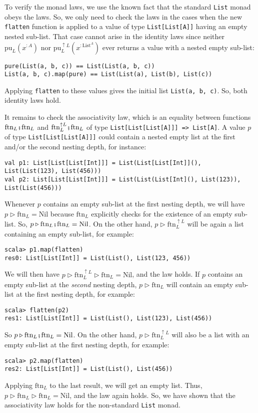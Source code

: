To verify the monad laws, we use the known fact that the standard
\lstinline!List! monad obeys the laws. So, we only need to check
the laws in the cases when the new \lstinline!flatten! function is
applied to a value of type \lstinline!List[List[A]]! having an empty
nested sub-list. That case cannot arise in the identity laws since
neither $\text{pu}_{L}(x^{:A})$ nor $\text{pu}_{L}^{\uparrow L}(x^{:\text{List}^{A}})$
ever returns a value with a nested empty sub-list:
\begin{lstlisting}
pure(List(a, b, c)) == List(List(a, b, c))
List(a, b, c).map(pure) == List(List(a), List(b), List(c))
\end{lstlisting}
Applying \lstinline!flatten! to these values gives the initial list
\lstinline!List(a, b, c)!. So, both identity laws hold.

It remains to check the associativity law, which is an equality between
functions $\text{ftn}_{L}\bef\text{ftn}_{L}$ and $\text{ftn}_{L}^{\uparrow L}\bef\text{ftn}_{L}$
of type \lstinline!List[List[List[A]]] => List[A]!. A value $p$
of type \lstinline!List[List[List[A]]]! could contain a nested empty
list at the first and/or the second nesting depth, for instance:
\begin{lstlisting}
val p1: List[List[List[Int]]] = List(List[List[Int]](), List(List(123), List(456)))
val p2: List[List[List[Int]]] = List(List(List[Int](), List(123)), List(List(456)))
\end{lstlisting}
Whenever $p$ contains an empty sub-list at the first nesting depth,
we will have $p\triangleright\text{ftn}_{L}=\text{Nil}$ because $\text{ftn}_{L}$
explicitly checks for the existence of an empty sub-list. So, $p\triangleright\text{ftn}_{L}\bef\text{ftn}_{L}=\text{Nil}$.
On the other hand, $p\triangleright\text{ftn}_{L}^{\uparrow L}$ will
be again a list containing an empty sub-list, for example:
\begin{lstlisting}
scala> p1.map(flatten)
res0: List[List[Int]] = List(List(), List(123, 456))
\end{lstlisting}
We will then have $p\triangleright\text{ftn}_{L}^{\uparrow L}\triangleright\text{ftn}_{L}=\text{Nil}$,
and the law holds. If $p$ contains an empty sub-list at the \emph{second}
nesting depth, $p\triangleright\text{ftn}_{L}$ will contain an empty
sub-list at the first nesting depth, for example:
\begin{lstlisting}
scala> flatten(p2)
res1: List[List[Int]] = List(List(), List(123), List(456)) 
\end{lstlisting}
So $p\triangleright\text{ftn}_{L}\bef\text{ftn}_{L}=\text{Nil}$.
On the other hand, $p\triangleright\text{ftn}_{L}^{\uparrow L}$ will
also be a list with an empty sub-list at the first nesting depth,
for example:
\begin{lstlisting}
scala> p2.map(flatten)
res2: List[List[Int]] = List(List(), List(456))
\end{lstlisting}
Applying $\text{ftn}_{L}$ to the last result, we will get an empty
list. Thus, $p\triangleright\text{ftn}_{L}\triangleright\text{ftn}_{L}=\text{Nil}$,
and the law again holds. So, we have shown that the associativity
law holds for the non-standard \lstinline!List! monad.

